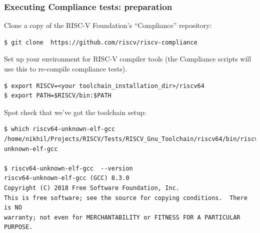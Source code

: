 \documentclass[aspectratio=169]{beamer}
\newcommand{\slidefont}{\scriptsize}
\begin{document}
\begin{frame}[fragile]
  \frametitle{Executing Compliance tests: preparation}

  \slidefont

  Clone a copy of the RISC-V Foundation's ``Compliance'' repository:

  \vspace{1ex}

  \begin{Verbatim}[frame=single]
$ git clone  https://github.com/riscv/riscv-compliance
  \end{Verbatim}

  \vspace{1ex}

  Set up your environment for RISC-V compiler tools (the Compliance
  scripts will use this to re-compile compliance tests).

  \begin{Verbatim}[frame=single]
$ export RISCV=<your toolchain_installation_dir>/riscv64
$ export PATH=$RISCV/bin:$PATH
  \end{Verbatim}

  Spot check that we've got the toolchain setup:
  \begin{Verbatim}[frame=single]
$ which riscv64-unknown-elf-gcc
/home/nikhil/Projects/RISCV/Tests/RISCV_Gnu_Toolchain/riscv64/bin/riscv64-unknown-elf-gcc

$ riscv64-unknown-elf-gcc  --version
riscv64-unknown-elf-gcc (GCC) 8.3.0
Copyright (C) 2018 Free Software Foundation, Inc.
This is free software; see the source for copying conditions.  There is NO
warranty; not even for MERCHANTABILITY or FITNESS FOR A PARTICULAR PURPOSE.
  \end{Verbatim}

\end{frame}

\end{document}
